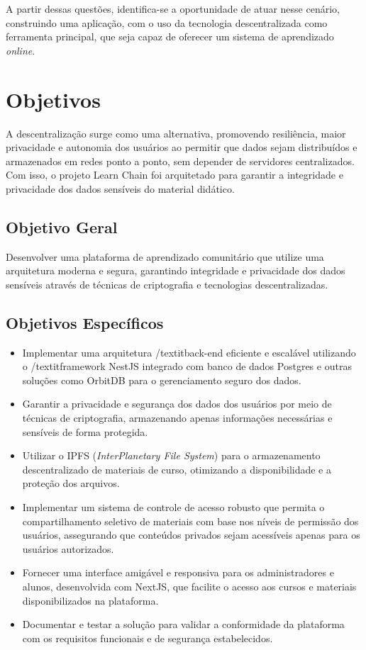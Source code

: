 A partir dessas questões, identifica-se a oportunidade de atuar nesse cenário, construindo uma aplicação, com o uso da tecnologia descentralizada como ferramenta principal, que seja capaz de oferecer um sistema de aprendizado \textit{online}.

\section{Objetivos}

A descentralização surge como uma alternativa, promovendo resiliência, maior privacidade e autonomia dos usuários ao permitir que dados sejam distribuídos e armazenados em redes ponto a ponto, sem depender de servidores centralizados. Com isso, o projeto Learn Chain foi arquitetado para garantir a integridade e privacidade dos dados sensíveis do material didático. 

\subsection{Objetivo Geral}

Desenvolver uma plataforma de aprendizado comunitário que utilize uma arquitetura moderna e segura, garantindo integridade e privacidade dos dados sensíveis através de técnicas de criptografia e tecnologias descentralizadas.

\subsection{Objetivos Específicos}

\begin{itemize}
    \item Implementar uma arquitetura /textit{back-end} eficiente e escalável utilizando o /textit{framework} NestJS integrado com banco de dados Postgres e outras soluções como OrbitDB para o gerenciamento seguro dos dados.
    \item Garantir a privacidade e segurança dos dados dos usuários por meio de técnicas de criptografia, armazenando apenas informações necessárias e sensíveis de forma protegida.
    \item Utilizar o IPFS (\textit{InterPlanetary File System}) para o armazenamento descentralizado de materiais de curso, otimizando a disponibilidade e a proteção dos arquivos.
    \item Implementar um sistema de controle de acesso robusto que permita o compartilhamento seletivo de materiais com base nos níveis de permissão dos usuários, assegurando que conteúdos privados sejam acessíveis apenas para os usuários autorizados.
    \item Fornecer uma interface amigável e responsiva para os administradores e alunos, desenvolvida com NextJS, que facilite o acesso aos cursos e materiais disponibilizados na plataforma.
    \item Documentar e testar a solução para validar a conformidade da plataforma com os requisitos funcionais e de segurança estabelecidos.
\end{itemize}

